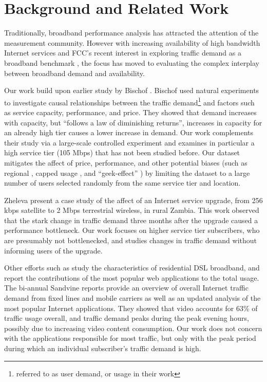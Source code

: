 \section{Background and Related Work}\label{sec:related}

Traditionally, broadband performance analysis has attracted the attention of 
the measurement community. However with increasing availability of high 
bandwidth Internet services and FCC's recent interest in exploring traffic 
demand as a broadband benchmark \cite{fcc2015progress-report}, the focus has 
moved to evaluating the complex interplay between broadband demand and 
availability.

Our work build upon earlier study by Bischof \ea \cite{dasu-imc2014}.
Bischof \ea used natural experiments to investigate causal relationships between 
the traffic demand\footnote{referred to as user demand, or usage in their work} 
and factors such as service capacity, performance, and price. They showed 
that demand increases with capacity, but ``follows a law of diminishing  
returns'', \ie increases in capacity for an already high tier causes a lower 
increase in demand.
Our work complements their study via a large-scale controlled experiment and 
examines in particular a high service tier (105 Mbps) that has not been studied 
before. Our dataset mitigates the affect of price, performance, and other 
potential biases (such as regional \cite{dasu-weather, dasu-region}, capped 
usage \cite{youre-capped}, and ``geek-effect'' \cite{dasu-imc2014}) by limiting 
the dataset to a large number of users selected randomly from the same service 
tier and location.

Zheleva \ea present a case study of the affect of an Internet service 
upgrade, from 256 kbps satellite to 2 Mbps terrestrial wireless, in rural 
Zambia. 
This work observed that the stark change in traffic demand three months after 
the upgrade caused a performance bottleneck. Our work focuses on higher 
service tier subscribers, who are presumably not bottlenecked, and studies 
changes in traffic demand without informing users of the upgrade.

Other efforts such as \cite{maier-imc2012} study the characteristics of 
residential DSL broadband, and report the contributions of the most popular 
web applications to the total usage.
The bi-annual Sandvine reports \cite{sandvine20141h, 
sandvine20142h} provide an overview of overall Internet traffic 
demand from fixed lines and mobile carriers as well as an updated analysis of 
the most popular Internet applications. They showed that video accounts for 63\%
of traffic usage overall, and traffic demand peaks during the peak evening 
hours, possibly due to increasing video content consumption. Our work does not 
concern with the applications responsible for most traffic, but only with the 
peak period during which an individual subscriber's traffic demand is high.


